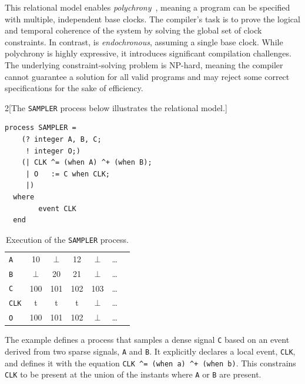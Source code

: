This relational model enables \emph{polychrony}~\cite{DBLP:journals/jcsc/GuernicTL03}, meaning a
program can be specified with multiple, independent base clocks. The compiler's task is to prove the
logical and temporal coherence of the system by solving the global set of clock constraints. In
contrast, \Lustre is \emph{endochronous}, assuming a single base clock. While polychrony is highly
expressive, it introduces significant compilation challenges. The underlying constraint-solving
problem is NP-hard, meaning the compiler cannot guarantee a solution for all valid programs and may
reject some correct specifications for the sake of efficiency.

\begin{multicols}{2}[The \texttt{SAMPLER} process below illustrates the relational model.]
  \begin{lstlisting}[basicstyle=\ttfamily\footnotesize\color{BlackText}]
  process SAMPLER =
    (? integer A, B, C;
     ! integer O;)
    (| CLK ^= (when A) ^+ (when B);
     | O   := C when CLK;
     |)
  where
        event CLK
  end
\end{lstlisting}

  \newcolumn

  \hfill

  \begin{table}[H]
    \centering
    \begin{tabular}{l|cccccc}
      \texttt{A}   & 10     & $\bot$ & 12  & $\bot$ & \dots \\
      \texttt{B}   & $\bot$ & 20     & 21  & $\bot$ & \dots \\
      \texttt{C}   & 100    & 101    & 102 & 103    & \dots \\
      \texttt{CLK} & t      & t      & t   & $\bot$ & \dots \\
      \texttt{O}   & 100    & 101    & 102 & $\bot$ & \dots \\
    \end{tabular}
    \caption{Execution of the \texttt{SAMPLER} process.}
    \label{tab:sota:synchronous:signal:exec}
  \end{table}
\end{multicols}

The example defines a process that samples a dense signal \texttt{C} based on an event derived from
two sparse signals, \texttt{A} and \texttt{B}. It explicitly declares a local event, \texttt{CLK},
and defines it with the equation \verb|CLK ^= (when a) ^+ (when b)|. This constrains \texttt{CLK} to
be present at the union of the instants where \texttt{A} or \texttt{B} are present.

